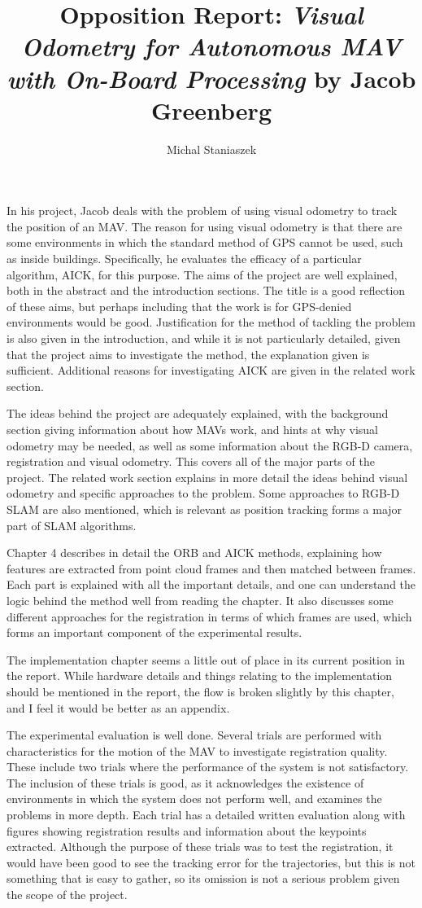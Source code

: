 \documentclass[11pt,a4paper]{article}
\author{Michal Staniaszek}
\title{Opposition Report: \emph{Visual Odometry for Autonomous MAV with On-Board
  Processing} by Jacob Greenberg}
\begin{document}
\maketitle
In his project, Jacob deals with the problem of using visual odometry to track
the position of an MAV. The reason for using visual odometry is that there are
some environments in which the standard method of GPS cannot be used, such as
inside buildings. Specifically, he evaluates the efficacy of a particular
algorithm, AICK, for this purpose. The aims of the project are well explained,
both in the abstract and the introduction sections. The title is a good
reflection of these aims, but perhaps including that the work is for GPS-denied
environments would be good. Justification for the method of tackling the problem
is also given in the introduction, and while it is not particularly detailed,
given that the project aims to investigate the method, the explanation given is
sufficient. Additional reasons for investigating AICK are given in the related
work section.

The ideas behind the project are adequately explained, with the background
section giving information about how MAVs work, and hints at why visual odometry
may be needed, as well as some information about the RGB-D camera, registration
and visual odometry. This covers all of the major parts of the project. The
related work section explains in more detail the ideas behind visual odometry
and specific approaches to the problem. Some approaches to RGB-D SLAM are also
mentioned, which is relevant as position tracking forms a major part of SLAM
algorithms.

Chapter 4 describes in detail the ORB and AICK methods, explaining how features
are extracted from point cloud frames and then matched between frames. Each part
is explained with all the important details, and one can understand the logic
behind the method well from reading the chapter. It also discusses some
different approaches for the registration in terms of which frames are used,
which forms an important component of the experimental results.

The implementation chapter seems a little out of place in its current position
in the report. While hardware details and things relating to the implementation
should be mentioned in the report, the flow is broken slightly by this chapter,
and I feel it would be better as an appendix.

The experimental evaluation is well done. Several trials are performed with
characteristics for the motion of the MAV to investigate registration quality.
These include two trials where the performance of the system is not
satisfactory. The inclusion of these trials is good, as it acknowledges the
existence of environments in which the system does not perform well, and
examines the problems in more depth. Each trial has a detailed written
evaluation along with figures showing registration results and information about
the keypoints extracted. Although the purpose of these trials was to test the
registration, it would have been good to see the tracking error for the
trajectories, but this is not something that is easy to gather, so its omission
is not a serious problem given the scope of the project.
\end{document}
